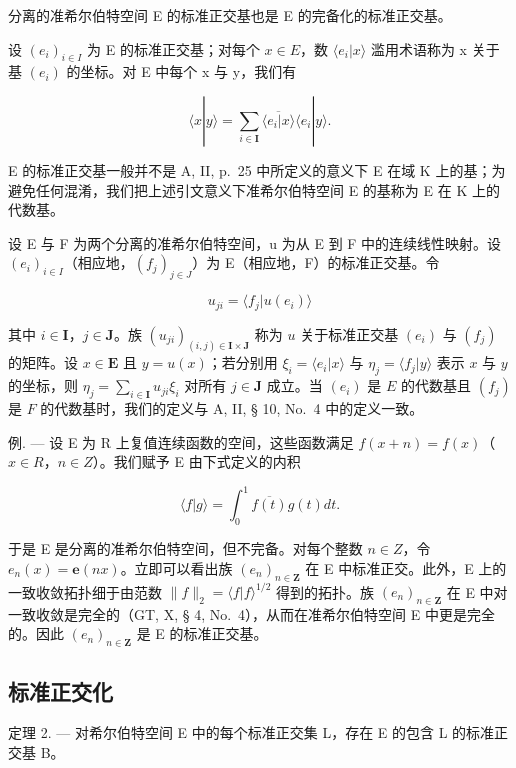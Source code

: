 分离的准希尔伯特空间 E 的标准正交基也是 E 的完备化的标准正交基。

设 \((e_{i})_{i\in I}\) 为 E 的标准正交基；对每个 \(x\in E\)，数 \(\langle e_{i}|x\rangle\) 滥用术语称为 x 关于基 \((e_{i})\) 的坐标。对 E 中每个 x 与 y，我们有

\[
\langle x | y \rangle = \sum_ {i \in \mathbf {I}} \overline {{\langle e _ {i} | x \rangle}} \langle e _ {i} | y \rangle .\tag{3}
\]

E 的标准正交基一般并不是 A, II, p.~25 中所定义的意义下 E 在域 K 上的基；为避免任何混淆，我们把上述引文意义下准希尔伯特空间 E 的基称为 E 在 K 上的代数基。

设 E 与 F 为两个分离的准希尔伯特空间，u 为从 E 到 F 中的连续线性映射。设 \((e_{i})_{i\in I}\)（相应地，\((f_{j})_{j\in J}\)）为 E（相应地，F）的标准正交基。令

\[
u _ {j i} = \langle f _ {j} | u (e _ {i}) \rangle
\]

其中 \(i \in \mathbf{I}\)，\(j \in \mathbf{J}\)。族 \((u_{ji})_{(i,j) \in \mathbf{I} \times \mathbf{J}}\) 称为 \(u\) 关于标准正交基 \((e_i)\) 与 \((f_j)\) 的矩阵。设 \(x \in \mathbf{E}\) 且 \(y = u(x)\)；若分别用 \(\xi_i = \langle e_i | x \rangle\) 与 \(\eta_j = \langle f_j | y \rangle\) 表示 \(x\) 与 \(y\) 的坐标，则 \(\eta_j = \sum_{i \in \mathbf{I}} u_{ji} \xi_i\) 对所有 \(j \in \mathbf{J}\) 成立。当 \((e_i)\) 是 \(E\) 的代数基且 \((f_j)\) 是 \(F\) 的代数基时，我们的定义与 A, II, § 10, No.~4 中的定义一致。

例. --- 设 E 为 R 上复值连续函数的空间，这些函数满足 \(f(x + n) = f(x)\)（\(x \in R\)，\(n \in Z\)）。我们赋予 E 由下式定义的内积

\[
\langle f | g \rangle = \int_ {0} ^ {1} \overline {{{{f (t)}}}} g (t) d t.
\]

于是 E 是分离的准希尔伯特空间，但不完备。对每个整数 \(n \in Z\)，令 \(e_{n}(x) = \mathbf{e}(nx)\)。立即可以看出族 \((e_{n})_{n \in \mathbf{Z}}\) 在 E 中标准正交。此外，E 上的一致收敛拓扑细于由范数 \(\|f\|_{2} = \langle f | f \rangle^{1/2}\) 得到的拓扑。族 \((e_{n})_{n \in \mathbf{Z}}\) 在 E 中对一致收敛是完全的（GT, X, § 4, No.~4），从而在准希尔伯特空间 E 中更是完全的。因此 \((e_{n})_{n \in \mathbf{Z}}\) 是 E 的标准正交基。

\subsection{标准正交化}

定理 2. --- 对希尔伯特空间 E 中的每个标准正交集 L，存在 E 的包含 L 的标准正交基 B。

